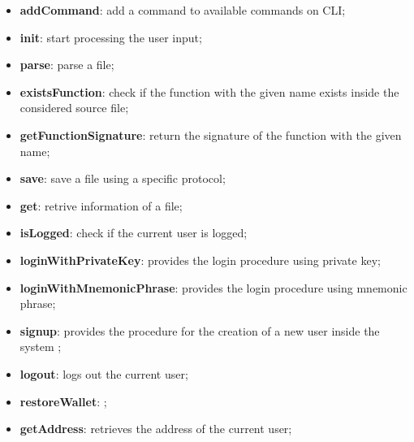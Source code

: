 				\begin{itemize}
					\item \textbf{addCommand}: add a command to available commands on CLI;
					\item \textbf{init}: start processing the user input;
				\end{itemize}
				
				\begin{itemize}
					\item \textbf{parse}: parse a file;   
					\item \textbf{existsFunction}: check if the function with the given name exists inside the considered source file;
					\item \textbf{getFunctionSignature}: return the signature of the function with the given name;
				\end{itemize}
				
				\begin{itemize}
					\item \textbf{save}: save a file using a specific protocol;
					\item \textbf{get}: retrive information of a file; 
				\end{itemize}
	
				\begin{itemize}
					\item \textbf{isLogged}: check if the current user is logged;
					\item \textbf{loginWithPrivateKey}: provides the login procedure using private key;
					\item \textbf{loginWithMnemonicPhrase}: provides the login procedure using mnemonic phrase;
					\item \textbf{signup}: provides the procedure for the creation of a new user inside the system ;
					\item \textbf{logout}: logs out the current user;
					\item \textbf{restoreWallet}: ;
					\item \textbf{getAddress}: retrieves the address of the current user;
				\end{itemize}
				
